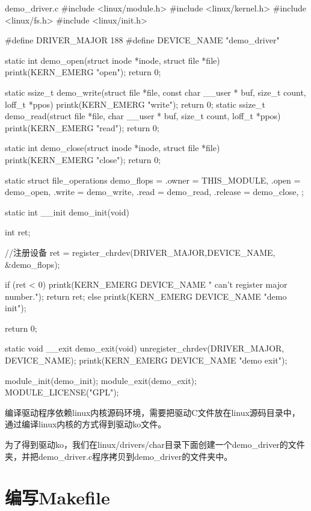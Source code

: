 \documentclass[lang=cn,newtx,10pt,scheme=chinese]{elegantbook}
\begin{document}
\begin{mycode}{demo\_driver.c}
#include <linux/module.h>
#include <linux/kernel.h>
#include <linux/fs.h>
#include <linux/init.h>

#define    DRIVER_MAJOR     188
#define    DEVICE_NAME     "demo_driver"

static int demo_open(struct inode *inode, struct file *file)
{    
    printk(KERN_EMERG "open\n");
    return 0;
}

static ssize_t demo_write(struct file *file, const char __user * buf, size_t count, loff_t *ppos)
{
    printk(KERN_EMERG "write\n");
    return 0;
}
static ssize_t demo_read(struct file *file,  char __user * buf, size_t count, loff_t *ppos)
{
    printk(KERN_EMERG "read\n");  
    return 0;
}

static int demo_close(struct inode *inode, struct file *file)
{
    printk(KERN_EMERG "close\n");
    return 0;
}

static struct file_operations demo_flops = 
{
    .owner  =   THIS_MODULE,
    .open   =   demo_open,     
    .write  =   demo_write,
    .read     =      demo_read,
    .release =  demo_close,
};

static int __init demo_init(void)
{
    int ret;
         
    //注册设备
    ret = register_chrdev(DRIVER_MAJOR,DEVICE_NAME, &demo_flops);

    if (ret < 0) 
    {
      printk(KERN_EMERG DEVICE_NAME " can't register major number.\n");
      return ret;
    }
    else
    {
        printk(KERN_EMERG DEVICE_NAME "demo init\n");
    }

    return 0;
}

static void __exit demo_exit(void)
{
    unregister_chrdev(DRIVER_MAJOR, DEVICE_NAME);
    printk(KERN_EMERG DEVICE_NAME "demo exit\n");
}

module_init(demo_init);
module_exit(demo_exit);
MODULE_LICENSE("GPL");
\end{mycode}

编译驱动程序依赖linux内核源码环境，需要把驱动C文件放在linux源码目录中，通过编译linux内核的方式得到驱动ko文件。

为了得到驱动ko，我们在linux/drivers/char目录下面创建一个demo\_driver的文件夹，并把demo\_driver.c程序拷贝到demo\_driver的文件夹中。

\section{编写Makefile}
\end{document}
